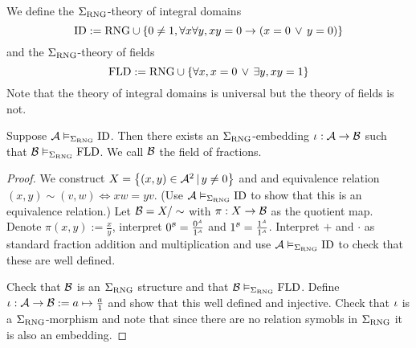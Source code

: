 \begin{dfn}
    We define the $\Sigma_{\mathrm{RNG}}$-theory of integral domains
    \[\operatorname{ID} := \mathrm{RNG} \cup \left\{0 \ne 1,
    \forall x \forall y, xy = 0 \to (x = 0 \, \lor \, y = 0)\right\}\]
    and the $\Sigma_{\mathrm{RNG}}$-theory of fields
    \[\operatorname{FLD} := \mathrm{RNG} \cup \left\{\forall x, x = 0 \, \lor \, \exists y, xy = 1\right\}\]
    Note that the theory of integral domains is universal but the 
    theory of fields is not.
\end{dfn}

\begin{prop}
    Suppose $\mathcal{A} \vDash_{\Sigma_{\mathrm{RNG}}} \operatorname{ID}$.
    Then there exists an $\Sigma_{\mathrm{RNG}}$-embedding $\iota : \mathcal{A} \to \mathcal{B}$
    such that $\mathcal{B} \vDash_{\Sigma_{\mathrm{RNG}}} \operatorname{FLD}$.
    We call $\mathcal{B}$ the field of fractions.
\end{prop}
\begin{proof}
    We construct $X = \left\{(x,y) \in {{\mathcal{A}}}^2 \,|\, y \ne 0\right\}$ and
    and equivalence relation $(x,y) \sim (v, w) \iff xw = yv$. 
    (Use $\mathcal{A} \vDash_{\Sigma_{\mathrm{RNG}}} \operatorname{ID}$ 
    to show that this is an equivalence relation.)
    Let ${\mathcal{B}} = X / \sim$ with $\pi : X \to \mathcal{B}$ as the quotient map. 
    Denote $\pi(x,y) := \frac{x}{y}$, 
    interpret $\modintp{\BB}{0} = \frac{\modintp{\AA}{0}}{\modintp{\AA}{1}}$ 
    and $\modintp{\BB}{1} = \frac{\modintp{\AA}{1}}{\modintp{\AA}{1}}$.
    Interpret $+$ and $\cdot$ as standard fraction addition and multiplication
    and use $\mathcal{A} \vDash_{\Sigma_{\mathrm{RNG}}} \operatorname{ID}$ to check that these are well defined.

    Check that $\mathcal{B}$ is an $\Sigma_{\mathrm{RNG}}$ structure and that 
    $\mathcal{B} \vDash_{\Sigma_{\mathrm{RNG}}} \operatorname{FLD}$.
    Define $\iota : {\mathcal{A}} \to {\mathcal{B}} := a \mapsto \frac{a}{1}$
    and show that this well defined and injective.
    Check that $\iota$ is a $\Sigma_{\mathrm{RNG}}$-morphism
    and note that since there are no relation symobls in $\Sigma_{\mathrm{RNG}}$
    it is also an embedding.
\end{proof}

